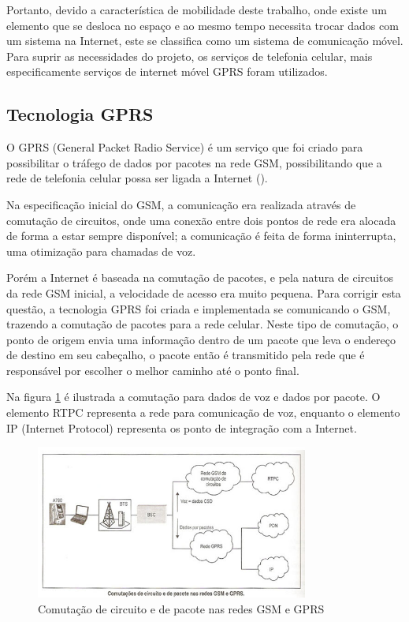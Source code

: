 Portanto, devido a característica de mobilidade deste trabalho, onde existe um elemento que se desloca no espaço e ao mesmo tempo necessita trocar dados com um sistema na Internet, este se classifica como um sistema de comunicação móvel. Para suprir as necessidades do projeto, os serviços de telefonia celular, mais especificamente serviços de internet móvel GPRS foram utilizados.

\subsection {Tecnologia GPRS}

O GPRS (General Packet Radio Service) é um serviço que foi criado para possibilitar o tráfego de dados por pacotes na rede GSM, possibilitando que a rede de telefonia celular possa ser ligada a Internet (\textcite{3gpp:2001}).

Na especificação inicial do GSM, a comunicação era realizada através de comutação de circuitos, onde uma conexão entre dois pontos de rede era alocada de forma a estar sempre disponível; a comunicação é feita de forma ininterrupta, uma otimização para chamadas de voz.

Porém a Internet é baseada na comutação de pacotes, e pela natura de circuitos da rede GSM inicial, a velocidade de acesso era muito pequena. Para corrigir esta questão, a tecnologia GPRS foi criada e implementada se comunicando o GSM, trazendo a comutação de pacotes para a rede celular. Neste tipo de comutação, o ponto de origem envia uma informação dentro de um pacote que leva o endereço de destino em seu cabeçalho, o pacote então é transmitido pela rede que é responsável por escolher o melhor caminho até o ponto final.

Na figura \ref{fig:gprscom} é ilustrada a comutação para dados de voz e dados por pacote. O elemento RTPC representa a rede para comunicação de voz, enquanto o elemento IP (Internet Protocol) representa os ponto de integração com a Internet.

\begin{figure}[h!]
			\centering
			\includegraphics[width=0.8\textwidth]{figures/gprs.jpg}
			\caption{Comutação de circuito e de pacote nas redes GSM e GPRS}
			\label{fig:gprscom}
\end{figure}

